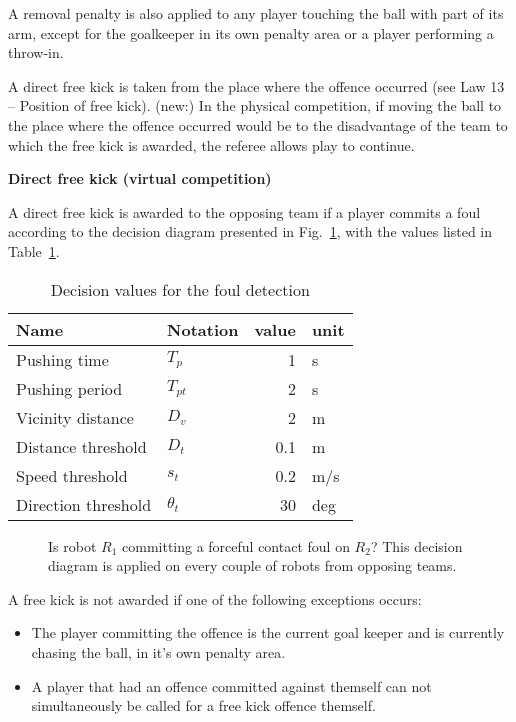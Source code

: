 \bigskip

A removal penalty is also applied to any player touching the ball with
  part of its arm, except for the goalkeeper in its own penalty area or a player
  performing a throw-in.


\bigskip


A direct free kick is taken from the place where the offence occurred (see Law 13 -- Position of free kick).
(new:) In the physical competition, if moving the ball to the place where the offence occurred would be to the disadvantage of the team to which the free kick is awarded, the referee allows play to continue.

\bigskip

{\bfseries Direct free kick (virtual competition)}

\headlinebox

A direct free kick is awarded to the opposing team if a player commits
a foul according to the decision diagram presented in
Fig.~\ref{fig:forceful_contact}, with the values listed in
Table~\ref{tab:forceful_contact}.

\begin{table}[h]
  \caption{\label{tab:forceful_contact}Decision values for the foul detection}
  \centering
  \begin{tabular}{|l l r l|}
    \hline
    Name & Notation & value & unit\\
    \hline
    Pushing time & $T_p$ & 1 & s\\
    Pushing period & $T_{pt}$ & 2 & s\\
    Vicinity distance & $D_v$ & 2 & m\\
    Distance threshold & $D_t$ & 0.1 & m\\
    Speed threshold & $s_t$ & 0.2 & m/s\\
    Direction threshold & $\theta_t$ & 30 & deg\\
    \hline
  \end{tabular}
\end{table}

\begin{figure}[h]
  \centering
  
  \caption{\label{fig:forceful_contact}
  Is robot $R_1$ committing a forceful contact foul on $R_2$?
  This decision diagram is applied on every couple of robots from opposing
  teams.}
\end{figure}


A free kick is not awarded if one of the following exceptions occurs:
\begin{itemize}
    \item The player committing the offence is the current goal keeper and is currently chasing the ball, in it's own penalty area.
  \item A player that had an offence committed against themself can not simultaneously be called for a free kick offence themself.
\end{itemize}

